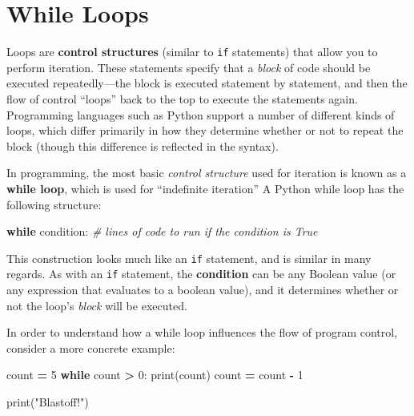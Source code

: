 \documentclass[]{book}
\newenvironment{Shaded}{\begin{snugshade}}{\end{snugshade}}
\newcommand{\DecValTok}[1]{\textcolor[rgb]{0.00,0.00,0.81}{#1}}
\newcommand{\StringTok}[1]{\textcolor[rgb]{0.31,0.60,0.02}{#1}}
\newcommand{\CommentTok}[1]{\textcolor[rgb]{0.56,0.35,0.01}{\textit{#1}}}
\newcommand{\ControlFlowTok}[1]{\textcolor[rgb]{0.13,0.29,0.53}{\textbf{#1}}}
\newcommand{\OperatorTok}[1]{\textcolor[rgb]{0.81,0.36,0.00}{\textbf{#1}}}
\newcommand{\BuiltInTok}[1]{#1}
\newcommand{\NormalTok}[1]{#1}
\begin{document}
\hypertarget{while-loops}{\section{While Loops}\label{while-loops}}

Loops are \textbf{control structures} (similar to \texttt{if}
statements) that allow you to perform iteration. These statements
specify that a \emph{block} of code should be executed repeatedly---the
block is executed statement by statement, and then the flow of control
``loops'' back to the top to execute the statements again. Programming
languages such as Python support a number of different kinds of loops,
which differ primarily in how they determine whether or not to repeat
the block (though this difference is reflected in the syntax).

In programming, the most basic \emph{control structure} used for
iteration is known as a \textbf{while loop}, which is used for
``indefinite iteration'' A Python while loop has the following
structure:

\begin{Shaded}
\begin{Highlighting}[]
\ControlFlowTok{while}\NormalTok{ condition:}
    \CommentTok{# lines of code to run if the condition is True}
\end{Highlighting}
\end{Shaded}

This construction looks much like an \texttt{if} statement, and is
similar in many regards. As with an \texttt{if} statement, the
\textbf{condition} can be any Boolean value (or any expression that
evaluates to a boolean value), and it determines whether or not the
loop's \emph{block} will be executed.

In order to understand how a while loop influences the flow of program
control, consider a more concrete example:

\begin{Shaded}
\begin{Highlighting}[]
\NormalTok{count }\OperatorTok{=} \DecValTok{5}
\ControlFlowTok{while}\NormalTok{ count }\OperatorTok{>} \DecValTok{0}\NormalTok{:}
    \BuiltInTok{print}\NormalTok{(count)}
\NormalTok{    count }\OperatorTok{=}\NormalTok{ count }\OperatorTok{-} \DecValTok{1}

\BuiltInTok{print}\NormalTok{(}\StringTok{"Blastoff!"}\NormalTok{)}
\end{Highlighting}
\end{Shaded}
\end{document}

